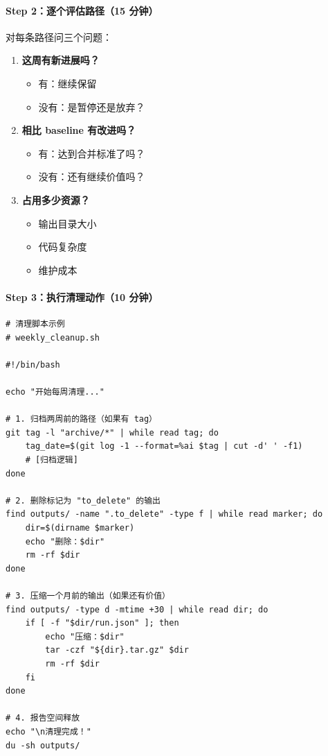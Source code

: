 \paragraph{Step 2：逐个评估路径（15 分钟）}

对每条路径问三个问题：
\begin{enumerate}
  \item \textbf{这周有新进展吗？}
  \begin{itemize}
    \item 有：继续保留
    \item 没有：是暂停还是放弃？
  \end{itemize}

  \item \textbf{相比 baseline 有改进吗？}
  \begin{itemize}
    \item 有：达到合并标准了吗？
    \item 没有：还有继续价值吗？
  \end{itemize}

  \item \textbf{占用多少资源？}
  \begin{itemize}
    \item 输出目录大小
    \item 代码复杂度
    \item 维护成本
  \end{itemize}
\end{enumerate}

\paragraph{Step 3：执行清理动作（10 分钟）}

\begin{verbatim}
# 清理脚本示例
# weekly_cleanup.sh

#!/bin/bash

echo "开始每周清理..."

# 1. 归档两周前的路径（如果有 tag）
git tag -l "archive/*" | while read tag; do
    tag_date=$(git log -1 --format=%ai $tag | cut -d' ' -f1)
    # [归档逻辑]
done

# 2. 删除标记为 "to_delete" 的输出
find outputs/ -name ".to_delete" -type f | while read marker; do
    dir=$(dirname $marker)
    echo "删除：$dir"
    rm -rf $dir
done

# 3. 压缩一个月前的输出（如果还有价值）
find outputs/ -type d -mtime +30 | while read dir; do
    if [ -f "$dir/run.json" ]; then
        echo "压缩：$dir"
        tar -czf "${dir}.tar.gz" $dir
        rm -rf $dir
    fi
done

# 4. 报告空间释放
echo "\n清理完成！"
du -sh outputs/
\end{verbatim}

